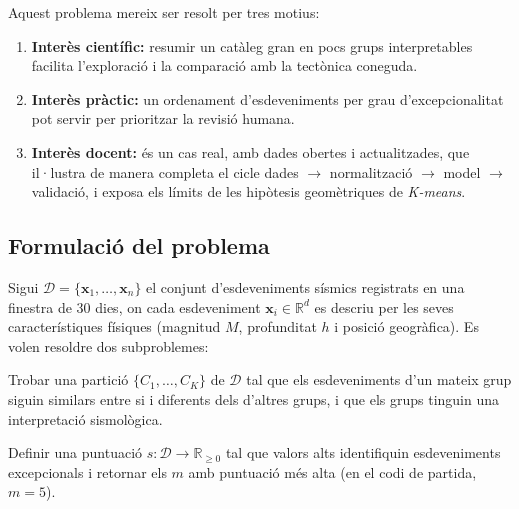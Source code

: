 \documentclass[11pt,a4paper]{article}
\newcommand{\R}{\mathbb{R}}
\begin{document}
Aquest problema mereix ser resolt per tres motius:
\begin{enumerate}[nosep]
  \item \textbf{Interès científic:} resumir un catàleg gran en pocs grups
        interpretables facilita l'exploració i la comparació amb la tectònica
        coneguda.
  \item \textbf{Interès pràctic:} un ordenament d'esdeveniments per grau
        d'excepcionalitat pot servir per prioritzar la revisió humana.
  \item \textbf{Interès docent:} és un cas real, amb dades obertes i
        actualitzades, que il·lustra de manera completa el cicle
        dades $\to$ normalització $\to$ model $\to$ validació, i exposa els
        límits de les hipòtesis geomètriques de \textit{K-means}.
\end{enumerate}

\subsection{Formulació del problema}
Sigui $\mathcal{D}=\{\mathbf{x}_1,\dots,\mathbf{x}_n\}$ el conjunt d'esdeveniments
sísmics registrats en una finestra de 30 dies, on cada esdeveniment
$\mathbf{x}_i\in\R^d$ es descriu per les seves característiques físiques
(magnitud $M$, profunditat $h$ i posició geogràfica). Es volen resoldre dos
subproblemes:
\begin{description}[leftmargin=1.2cm,style=nextline]
  \item[P1 (agrupació)] Trobar una partició $\{C_1,\dots,C_K\}$ de $\mathcal{D}$
        tal que els esdeveniments d'un mateix grup siguin similars entre si i
        diferents dels d'altres grups, i que els grups tinguin una
        interpretació sismològica.
  \item[P2 (anomalies)] Definir una puntuació $s:\mathcal{D}\to\R_{\ge 0}$ tal
        que valors alts identifiquin esdeveniments excepcionals i retornar els
        $m$ amb puntuació més alta (en el codi de partida, $m=5$).
\end{description}
\end{document}
